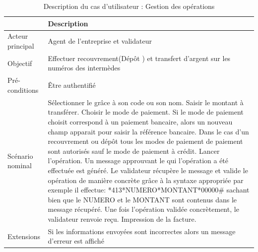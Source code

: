 			\begin{table}[H]
				\begin{center}
					{\renewcommand{\arraystretch}{1.5}\begin{tabularx}{\textwidth}{|l|X|}
							\hline & Description \\
							\hline Acteur principal & Agent de l'entreprise et validateur \\
							\hline Objectif & Effectuer recouvrement(Dépôt ) et transfert d'argent sur les numéros des intermèdes\\
							\hline Pré-conditions & Être authentifié\\
							\hline
							Scénario nominal & Sélectionner le grâce à son code ou son nom.\newline
							Saisir le montant à transférer.\newline\newline
							Choisir le mode de paiement. Si le mode de paiement choisit correspond à un paiement bancaire, alors un nouveau champ apparait pour saisir la référence bancaire. Dans le cas d'un recouvrement ou dépôt tous les modes de paiement de paiement sont autorisés sauf le mode de paiement à crédit.\newline\newline
							Lancer l'opération.\newline\newline
							Un message approuvant le qui l'opération a été effectuée est généré.\newline\newline
							Le validateur récupère le message et valide le opération de manière concrète grâce à la syntaxe appropriée par exemple il effectue:\newline
							*413*NUMERO*MONTANT*00000\# sachant bien que le NUMERO et le MONTANT sont contenus dans le message récupéré.\newline
							Une fois l'opération validée concrètement, le validateur renvoie reçu.\newline
							Impression de la facture.
							\\
							\hline
							Extensions &  Si les informations envoyées sont incorrectes alors un message d'erreur est affiché \\ 
							\hline               
					\end{tabularx}}
				\end{center}
				\caption{Description du cas d'utilisateur : Gestion des opérations}
			\end{table}
